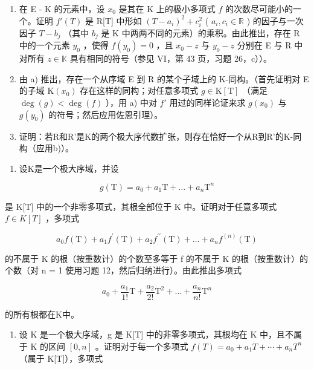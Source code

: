 \begin{enumerate}
\def\labelenumi{\alph{enumi})}
\item
  在 E - K 的元素中，设 \(x_0\) 是其在 K 上的极小多项式 \(f\) 的次数尽可能小的一个。证明 \(f'(T)\) 是 R{[}T{]} 中形如 \((T - a_i)^2 + c_i^2\) ( \(a_i, c_i \in \mathbb{R}\) ) 的因子与一次因子 \(T - b_j\) （其中 \(b_j\) 是 K 中两两不同的元素）的乘积。由此推出，存在 R 中的一个元素 \(y_0\) ，使得 \(f(y_0) = 0\) ，且 \(x_0 - z\) 与 \(y_0 - z\) 分别在 E 与 R 中对所有 \(z \in \mathbb{K}\) 具有相同的符号（参见 VI，第 43 页，习题 26，c））。
\item
  由 a) 推出，存在一个从序域 E 到 R 的某个子域上的 K-同构。（首先证明对 E 的子域 \(\mathrm{K}(x_{0})\) 存在这样的同构；对任意多项式 \(g \in \mathrm{K}[\mathrm{T}]\) （满足 \(\deg(g) < \deg(f)\) ），用 a) 中对 \(f'\) 用过的同样论证来求 \(g(x_{0})\) 与 \(g(y_{0})\) 的符号；然后应用佐恩引理）。
\item
  证明：若R和R'是K的两个极大序代数扩张，则存在恰好一个从R到R'的K-同构（应用b)）。
\end{enumerate}

\begin{enumerate}
\def\labelenumi{\arabic{enumi})}
\setcounter{enumi}{15}
\tightlist
\item
  设K是一个极大序域，并设
\end{enumerate}

\[
g (\mathrm{T}) = a _ {0} + a _ {1} \mathrm{T} + \dots + a _ {n} \mathrm{T} ^ {n}
\]

是 K{[}T{]} 中的一个非零多项式，其根全部位于 K 中。证明对于任意多项式 \(f \in K[T]\) ，多项式

\[
a _ {0} f (\mathrm{T}) + a _ {1} f ^ {\prime} (\mathrm{T}) + a _ {2} f ^ {\prime \prime} (\mathrm{T}) + \dots + a _ {n} f ^ {(n)} (\mathrm{T})
\]

的不属于 K 的根（按重数计）的个数至多等于 f 的不属于 K 的根（按重数计）的个数（对 n = 1 使用习题 12，然后归纳进行）。由此推出多项式

\[
a _ {0} + \frac {a _ {1}}{1 !} \mathrm{T} + \frac {a _ {2}}{2 !} \mathrm{T} ^ {2} + \dots + \frac {a _ {n}}{n !} \mathrm{T} ^ {n}
\]

的所有根都在K中。

\begin{enumerate}
\def\labelenumi{\arabic{enumi})}
\setcounter{enumi}{16}
\tightlist
\item
  设 K 是一个极大序域，g 是 K{[}T{]} 中的非零多项式，其根均在 K 中，且不属于 K 的区间 \([0, n]\) 。证明对于每一个多项式 \(f(T) = a_{0} + a_{1}T + \cdots + a_{n}T^{n}\) （属于 K{[}T{]}），多项式
\end{enumerate}

